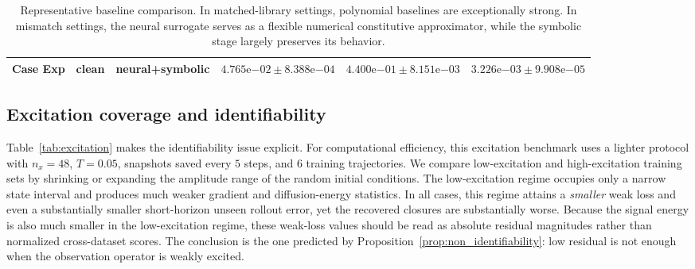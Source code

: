 \documentclass[preprint,12pt]{elsarticle}
\begin{document}
\begin{table}[t]
{\begin{tabular}{lllccc}
Case Exp & clean & neural+symbolic & $4.765\mathrm{e}{-02} \pm 8.388\mathrm{e}{-04}$ & $4.400\mathrm{e}{-01} \pm 8.151\mathrm{e}{-03}$ & $3.226\mathrm{e}{-03} \pm 9.908\mathrm{e}{-05}$ \\
\bottomrule
\end{tabular}
}
\caption{Representative baseline comparison. In matched-library settings, polynomial baselines are exceptionally strong. In mismatch settings, the neural surrogate serves as a flexible numerical constitutive approximator, while the symbolic stage largely preserves its behavior.}
\label{tab:baseline_map}
\end{table}

\subsection{Excitation coverage and identifiability}

Table~\ref{tab:excitation} makes the identifiability issue explicit. For computational efficiency, this excitation benchmark uses a lighter protocol with $n_x=48$, $T=0.05$, snapshots saved every $5$ steps, and $6$ training trajectories. We compare low-excitation and high-excitation training sets by shrinking or expanding the amplitude range of the random initial conditions. The low-excitation regime occupies only a narrow state interval and produces much weaker gradient and diffusion-energy statistics. In all cases, this regime attains a \emph{smaller} weak loss and even a substantially smaller short-horizon unseen rollout error, yet the recovered closures are substantially worse. Because the signal energy is also much smaller in the low-excitation regime, these weak-loss values should be read as absolute residual magnitudes rather than normalized cross-dataset scores. The conclusion is the one predicted by Proposition~\ref{prop:non_identifiability}: low residual is not enough when the observation operator is weakly excited.
\end{document}
